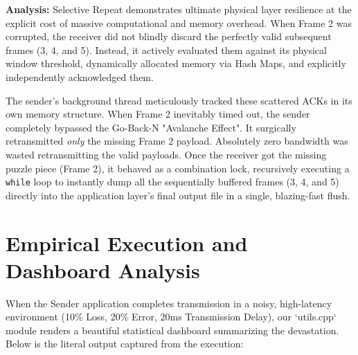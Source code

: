 \documentclass[12pt, a4paper]{article}
\begin{document}
\textbf{Analysis:} Selective Repeat demonstrates ultimate physical layer resilience at the explicit cost of massive computational and memory overhead. When Frame 2 was corrupted, the receiver did not blindly discard the perfectly valid subsequent frames (3, 4, and 5). Instead, it actively evaluated them against its physical window threshold, dynamically allocated memory via Hash Maps, and explicitly independently acknowledged them. 

The sender's background thread meticulously tracked these scattered ACKs in its own memory structure. When Frame 2 inevitably timed out, the sender completely bypassed the Go-Back-N "Avalanche Effect". It surgically retransmitted \textit{only} the missing Frame 2 payload. Absolutely zero bandwidth was wasted retransmitting the valid payloads. Once the receiver got the missing puzzle piece (Frame 2), it behaved as a combination lock, recursively executing a \texttt{while} loop to instantly dump all the sequentially buffered frames (3, 4, and 5) directly into the application layer's final output file in a single, blazing-fast flush.

\section{Empirical Execution and Dashboard Analysis}

When the Sender application completes transmission in a noisy, high-latency environment (10\% Loss, 20\% Error, 20ms Transmission Delay), our `utils.cpp` module renders a beautiful statistical dashboard summarizing the devastation. Below is the literal output captured from the execution:
\end{document}
